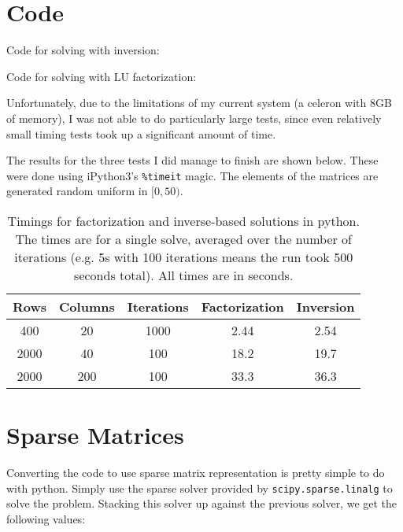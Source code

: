 \documentclass{article}
\begin{document}
\section{Code}

Code for solving with inversion:



Code for solving with LU factorization:



Unfortunately, due to the limitations of my current system (a celeron with 8GB
of memory), I was not able to do particularly large tests, since even relatively
small timing tests took up a significant amount of time.

The results for the three tests I did manage to finish are shown below. These
were done using iPython3's \texttt{\%timeit} magic. The elements of the matrices
are generated random uniform in $[0,50)$.

\begin{table}[h]
  \centering
  \begin{tabular}{|c|c|c|c|c|}
    \hline
    Rows & Columns & Iterations & Factorization & Inversion \\ \hline \hline
    400 & 20 & 1000 & 2.44 & 2.54\\ \hline
    2000 & 40 & 100 & 18.2 & 19.7\\ \hline
    2000 & 200 & 100 & 33.3 & 36.3\\ \hline
  \end{tabular}
  \caption{Timings for factorization and inverse-based solutions in python. The
    times are for a single solve, averaged over the number of iterations (e.g.
    5s with 100 iterations means the run took 500 seconds total). All times are
    in seconds.}
  \label{tab: solvecomparetimings}
\end{table}

\section{Sparse Matrices}

Converting the code to use sparse matrix representation is pretty simple to do
with python. Simply use the sparse solver provided by
\texttt{scipy.sparse.linalg} to solve the problem. Stacking this solver up
against the previous solver, we get the following values:
\end{document}
